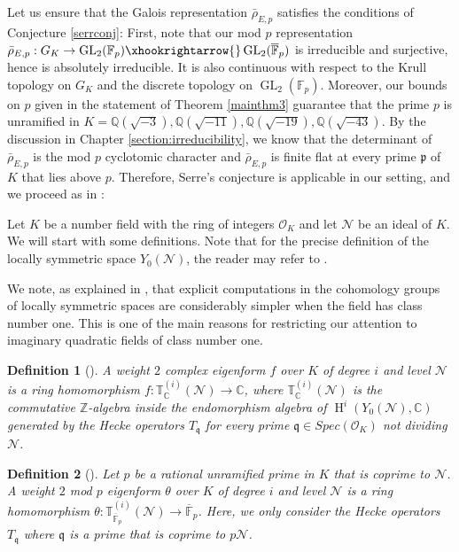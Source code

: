 \documentclass[]{article}
\newtheorem{definition}{Definition}
\newcommand {\ZZ}{{\mathbb{Z}}}
\newcommand {\QQ}{{\mathbb{Q}}}
\newcommand {\mcalO}{{\mathcal{O}}}
\begin{document}
Let us ensure that the Galois representation $\bar{\rho}_{E, p}$ satisfies the conditions of Conjecture \ref{serrconj}: First, note that our mod $p$ representation $\bar{\rho}_{E, p}: G_K\to \operatorname{GL}_2(\mathbb{F}_p)\xhookrightarrow{}\operatorname{GL}_2(\overline{\mathbb{F}}_p)$ is irreducible and surjective, hence is absolutely irreducible. It is also continuous with respect to the Krull topology on $G_K$ and the discrete topology on $\operatorname{GL}_2(\mathbb{F}_p)$. Moreover, our bounds on $p$ given in the statement of Theorem \ref{mainthm3} guarantee that the prime $p$ is unramified in 
$K=\QQ(\sqrt{-3}), \QQ(\sqrt{-11}), \QQ(\sqrt{-19}), \QQ(\sqrt{-43})$. By the discussion in Chapter \ref{section:irreducibility}, we know that the determinant of $\bar{\rho}_{E, p}$ is the mod $p$ cyclotomic character and $\bar{\rho}_{E, p}$ is finite flat at every prime $\mathfrak{p}$ of $K$ that lies above $p$. Therefore, Serre's conjecture is applicable in our setting, and we proceed as in \cite{cturcacs2018fermat}: 

Let $K$ be a number field with the ring of integers $\mcalO_K$ and let $\mathcal{N}$ be an ideal of $K$. We will start with some definitions. Note that for the precise definition of the locally symmetric space $Y_0(\mathcal{N})$, the reader may refer to \cite[Section 2]{csengun2018asymptotic}.

We note, as explained in \cite{cturcacs2018fermat}, that explicit computations in the cohomology groups of locally symmetric spaces are considerably simpler when the field has class number one. This is one of the main reasons for restricting our attention to imaginary quadratic fields of class number one.

\begin{definition}[{\cite[Section 2.1]{kara2020asymptotic}}] A weight $2$ complex eigenform $f$ over $K$ of degree $i$ and level $\mathcal{N}$ is a ring homomorphism $f: \mathbb{T}_{\mathbb{C}}^{(i)}(\mathcal{N})\to \mathbb{C}$, where $\mathbb{T}_{\mathbb{C}}^{(i)}(\mathcal{N})$ is the commutative $\ZZ$-algebra inside the endomorphism algebra of $\operatorname{H}^i(Y_0(\mathcal{N}), \mathbb{C})$ generated by the Hecke operators $T_{\mathfrak{q}}$ for every prime $\mathfrak{q}\in Spec(\mcalO_K)$ not dividing $\mathcal{N}$.
\end{definition}

\begin{definition}[{\cite[Section 2.1]{kara2020asymptotic}}]
Let $p$ be a rational unramified prime in $K$ that is coprime to $\mathcal{N}$. A weight $2$ mod $p$ eigenform $\theta$ over $K$ of degree $i$ and level $\mathcal{N}$ is a ring homomorphism $\theta: \mathbb{T}_{\overline{\mathbb{F}}_p}^{(i)}(\mathcal{N})\to \overline{\mathbb{F}}_p$. Here, we only consider the Hecke operators $T_{\mathfrak{q}}$ where $\mathfrak{q}$ is a prime that is coprime to $p\mathcal{N}$.
\end{definition}
\end{document}
